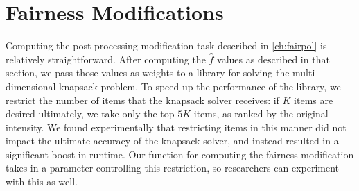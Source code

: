 \section{Fairness Modifications}
Computing the post-processing modification task described in \autoref{ch:fairpol} is relatively straightforward. After computing the $\hat{f}$ values as described in that section, we pass those values as weights to a library for solving the multi-dimensional knapsack problem. To speed up the performance of the library, we restrict the number of items that the knapsack solver receives: if $K$ items are desired ultimately, we take only the top $5K$ items, as ranked by the original \pp intensity. We found experimentally that restricting items in this manner did not impact the ultimate accuracy of the knapsack solver, and instead resulted in a significant boost in runtime. Our function for computing the fairness modification takes in a parameter controlling this restriction, so researchers can experiment with this as well.


